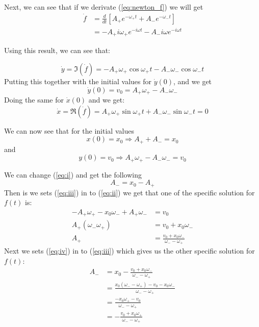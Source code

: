 \documentclass[english,notitlepage,reprint,nofootinbib]{revtex4-1}  %
\begin{document}
	Next, we can see that if we derivate (\ref{eq:newton_f}) we will get
	\begin{align*}
		\dot{f} &= \frac{d}{dt} \left[ A_+ e^{- \omega_+ t} + A_- e^{- \omega_- t}  \right] \\
		&= -A_+ i \omega_+ e^{-i \omega t} - A_- i \omega e^{-i \omega t}
	\end{align*}

	Using this result, we can see that:

	\begin{equation*}
		\dot{y} = \Im( \dot{f} ) = -A_+ \omega_+ \cos \omega_+ t - A_- \omega_- \cos \omega_- t
	\end{equation*}
	Putting this together with the initial values for $\dot{y} (0)$, and we get
	\begin{equation*}
		\dot{y} (0) = v_0 = A_+ \omega_+ - A_- \omega_- 
	\end{equation*}
	Doing the same for $\dot{x} (0)$ and we get:
	\begin{equation*}
		\dot{x} = \Re ( \dot{f} ) = A_+ \omega_+ \sin \omega_+ t + A_- \omega_- \sin \omega_- t = 0
	\end{equation*}

	We can now see that for the initial values
	\begin{equation} \label{eq:i}
		x(0) = x_0 \Rightarrow A_+ + A_- = x_0
	\end{equation}
	and
	\begin{equation} \label{eq:ii}
		y(0) = v_0 \Rightarrow A_+ \omega_+ - A_- \omega_- = v_0
	\end{equation}
	
	We can change (\ref{eq:i}) and get the following
	\begin{equation} \label{eq:iii}
		A_- = x_0 - A_+
	\end{equation}
	Then is we sets (\ref{eq:iii}) in to (\ref{eq:ii}) we get that one of the specific solution for $f(t)$ is:
	\begin{align} \label{eq:iv}
		-A_+ \omega_+ - x_0 \omega_- + A_+ \omega_- &= v_0 \nonumber \\
		A_+ (\omega_- \omega_+) &= v_0 + x_0 \omega_- \nonumber \\
		A_+ &= \frac{v_0 + x_0 \omega_-}{\omega_- - \omega_+}
	\end{align}
	Next we sets (\ref{eq:iv}) in to (\ref{eq:iii}) which gives us the other specific solution for $f(t)$:
	\begin{align*}
		A_- &= x_0 - \frac{v_0 + x_0 \omega_-}{\omega_- - \omega_+} \\
		&= \frac{x_0 (\omega_- - \omega_+) - v_0 - x_0 \omega_-}{\omega_- - \omega_+} \\
		&= \frac{-x_0 \omega_+ - v_0}{\omega_- - \omega_+} \\
		&= - \frac{v_0 + x_0 \omega_+}{\omega_- - \omega_+}
	\end{align*}
\end{document}
